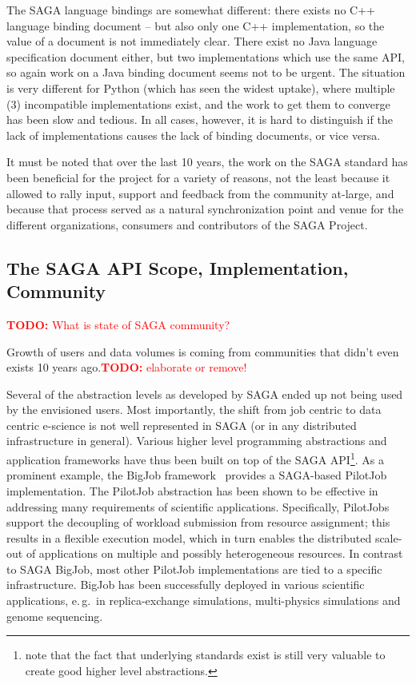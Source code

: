 \documentclass{article}
\newcommand{\B}[1]{\textbf{#1}}
\newcommand{\todo}[1]{{\textcolor{red}{\B{TODO:} #1 }}}
\newcommand{\todo}[1]{}
\begin{document}
  The SAGA language bindings are somewhat different: there exists no C++
  language binding document -- but also only one C++ implementation, so
  the value of a document is not immediately clear.  There exist no Java
  language specification document either, but two implementations which
  use the same API, so again work on a Java binding document seems not
  to be urgent.  The situation is very different for Python (which has
  seen the widest uptake), where multiple (3) incompatible
  implementations exist, and the work to get them to converge has been
  slow and tedious.  In all cases, however, it is hard to distinguish if
  the lack of implementations causes the lack of binding documents, or
  vice versa.
  
  It must be noted that over the last 10 years, the work on the SAGA
  standard has been beneficial for the project for a variety of reasons,
  not the least because it allowed to rally input, support and feedback
  from the community at-large, and because that process served as
  a natural synchronization point and venue for the different
  organizations, consumers and contributors of the SAGA Project.


 \subsection{The SAGA API Scope, Implementation, Community}

  \todo{What is state of SAGA community?}

  Growth of users and data volumes is coming from communities that
  didn't even exists 10 years ago.\todo{elaborate or remove!}
 
  Several of the abstraction levels as developed by SAGA ended up not
  being used by the envisioned users.  Most importantly, the shift from
  job centric to data centric e-science is not well represented in SAGA
  (or in any distributed infrastructure in general).  Various higher
  level programming abstractions and application frameworks have thus
  been built on top of the SAGA API\footnote{note that the fact that
  underlying standards exist is still very valuable to create good
  higher level abstractions.}.  As a prominent example, the BigJob
  framework~\cite{saga_bigjob_condor_cloud}  provides a SAGA-based
  PilotJob implementation. The PilotJob abstraction has been shown to be
  effective in addressing many requirements of scientific applications.
  Specifically, PilotJobs support the decoupling of workload submission
  from resource assignment; this results in a flexible execution model,
  which in turn enables the distributed scale-out of applications on
  multiple and possibly heterogeneous resources. In contrast to SAGA
  BigJob, most other PilotJob implementations are tied to a specific
  infrastructure.  BigJob has been successfully deployed in various
  scientific applications, e.\,g.\ in replica-exchange simulations,
  multi-physics simulations and genome sequencing.
\end{document}
